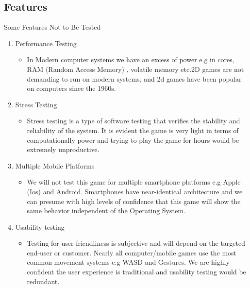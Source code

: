 

\subsection{Features}


\centerline{Some Features Not to Be Tested
}

\begin{enumerate}
   \item Performance Testing 
   \begin{itemize}
     \item  In Modern computer systems we have an excess of power e.g in cores, RAM (Random Access Memory) , volatile memory etc.2D games are not demanding to run on modern systems, and 2d games have been popular on computers since the 1960s.
   \end{itemize}
  
  \item Stress Testing
   \begin{itemize}
     \item Stress testing is a type of software testing that verifies the stability and reliability of the system. It is evident the game is very light in terms of computationally power and trying to play the game for hours would be extremely unproductive.

   \end{itemize}

     \item Multiple Mobile Platforms
   \begin{itemize}
     \item We will not test this game for multiple smartphone platforms e.g Apple (Ios) and Android. Smartphones have near-identical architecture and we can presume with high levels of confidence that this game will show the same behavior independent of the Operating System.
   \end{itemize}



 \item Usability testing
   \begin{itemize}
 	\item 
 	 Testing for user-friendliness is subjective and will depend on the targeted end-user or customer. Nearly all computer/mobile games use the most common movement systems e.g WASD and Gestures. We are highly confident the user experience is traditional and usability testing would be redundant.
 	 \end{itemize}
 	 \end{enumerate}
